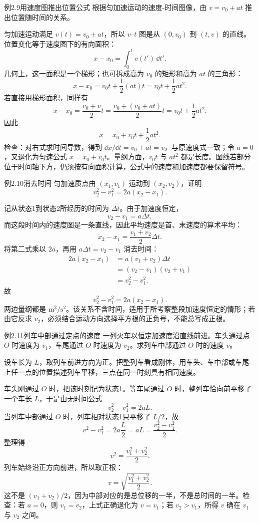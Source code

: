 \begin{origexamplebox}{例2.9\quad 用速度图推出位置公式}
根据匀加速运动的速度-时间图像，由 $v=v_0+at$ 推出位置随时间的关系。
\end{origexamplebox}
\begin{xesolution}
匀加速运动满足 $v(t)=v_0+at$，所以 $v$--$t$ 图是从 $(0,v_0)$ 到
$(t,v)$ 的直线。位置变化等于速度图下的有向面积：
\[
 x-x_0=\int_0^t v(t')\,\dd t'.
\]
几何上，这一面积是一个梯形；也可拆成高为 $v_0$ 的矩形和高为 $at$ 的三角形：
\[
 x-x_0=v_0t+\frac12(at)t
 =v_0t+\frac12at^2.
\]
若直接用梯形面积，同样有
\[
  x-x_0=\frac{v_0+v}{2}t
  =\frac{v_0+(v_0+at)}{2}t
  =v_0t+\frac12at^2.
\]
因此
\[
 \boxed{x=x_0+v_0t+\frac12at^2}.
\]
检查：对右式求时间导数，得到 $\dd x/\dd t=v_0+at=v$，与原速度式一致；令 $a=0$，又退化为匀速公式 $x=x_0+v_0t$。量纲方面，$v_0t$ 与 $at^2$ 都是长度。图线若部分位于时间轴下方，仍须按有向面积计算，公式中的速度和加速度都要保留符号。
\end{xesolution}

\begin{origexamplebox}{例2.10\quad 消去时间}
匀加速质点由 $(x_1,v_1)$ 运动到 $(x_2,v_2)$，证明
\[
  v_2^2-v_1^2=2a(x_2-x_1).
\]
\end{origexamplebox}
\begin{xesolution}
记从状态1到状态2所经历的时间为 $\Delta t$。由于加速度恒定，
\[
 v_2-v_1=a\Delta t,
\]
而这段时间内的速度图是一条直线，因此平均速度是首、末速度的算术平均：
\[
  x_2-x_1=\frac{v_1+v_2}{2}\Delta t.
\]
将第二式乘以 $2a$，再用 $a\Delta t=v_2-v_1$ 消去时间：
\[
\begin{aligned}
2a(x_2-x_1)
 &=a(v_1+v_2)\Delta t\\
 &=(v_2-v_1)(v_2+v_1)\\
 &=v_2^2-v_1^2.
\end{aligned}
\]
故
\[
 \boxed{v_2^2-v_1^2=2a(x_2-x_1)}.
\]
两边量纲都是 $\mathrm{m^2/s^2}$。该关系不含时间，适用于所考察整段加速度恒定的情形；若由它反求 $v_2$，必须结合运动方向选择平方根的正负号，不能总写成正根。
\end{xesolution}

\begin{origexamplebox}{例2.11\quad 列车中部通过定点的速度}
一列火车以恒定加速度沿直线前进。车头通过点 $O$ 时速度为 $v_1$，车尾通过 $O$ 时速度为 $v_2$。求列车中部通过 $O$ 时的速度 $v$。
\end{origexamplebox}
\begin{xesolution}
设车长为 $L$，取列车前进方向为正。把整列车看成刚体，用车头、车中部或车尾上任一点的位置描述列车平移，三点在同一时刻具有相同速度。

车头刚通过 $O$ 时，把该时刻记为状态1。等车尾通过 $O$ 时，整列车恰向前平移了一个车长 $L$，于是由无时间公式
\[
  v_2^2-v_1^2=2aL.
\]
当列车中部通过 $O$ 时，列车相对状态1只平移了 $L/2$，故
\[
 v^2-v_1^2=2a\frac L2=aL=\frac{v_2^2-v_1^2}{2}.
\]
整理得
\[
 v^2=\frac{v_1^2+v_2^2}{2}.
\]
列车始终沿正方向前进，所以取正根：
\[
  \boxed{v=\sqrt{\frac{v_1^2+v_2^2}{2}}}.
\]
这不是 $(v_1+v_2)/2$，因为中部对应的是总位移的一半，不是总时间的一半。检查：若 $a=0$，则 $v_1=v_2$，上式正确退化为 $v=v_1$；若 $v_2>v_1$，所得 $v$ 确在 $v_1$ 与 $v_2$ 之间。
\end{xesolution}

